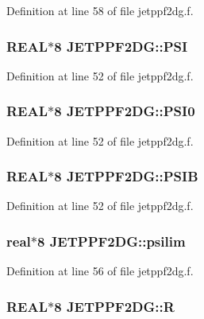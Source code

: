 Definition at line 58 of file jetppf2dg.f.\hypertarget{namespaceJETPPF2DG_b093dcbbe39feeaa433796831d6374de}{
\subsubsection[PSI]{\setlength{\rightskip}{0pt plus 5cm}REAL$\ast$8 {\bf JETPPF2DG::PSI}}}
\label{namespaceJETPPF2DG_b093dcbbe39feeaa433796831d6374de}




Definition at line 52 of file jetppf2dg.f.\hypertarget{namespaceJETPPF2DG_0aea03eeb6f87047b94e1a0b718253af}{
\subsubsection[PSI0]{\setlength{\rightskip}{0pt plus 5cm}REAL$\ast$8 {\bf JETPPF2DG::PSI0}}}
\label{namespaceJETPPF2DG_0aea03eeb6f87047b94e1a0b718253af}




Definition at line 52 of file jetppf2dg.f.\hypertarget{namespaceJETPPF2DG_e557339a1c12ba7e9ef7deadc7465739}{
\subsubsection[PSIB]{\setlength{\rightskip}{0pt plus 5cm}REAL$\ast$8 {\bf JETPPF2DG::PSIB}}}
\label{namespaceJETPPF2DG_e557339a1c12ba7e9ef7deadc7465739}




Definition at line 52 of file jetppf2dg.f.\hypertarget{namespaceJETPPF2DG_35264362cd8206b3671ba0049d7b3d5f}{
\subsubsection[psilim]{\setlength{\rightskip}{0pt plus 5cm}real$\ast$8 {\bf JETPPF2DG::psilim}}}
\label{namespaceJETPPF2DG_35264362cd8206b3671ba0049d7b3d5f}




Definition at line 56 of file jetppf2dg.f.\hypertarget{namespaceJETPPF2DG_e8aae9ece2ea51185b537f3815875dbe}{
\subsubsection[R]{\setlength{\rightskip}{0pt plus 5cm}REAL$\ast$8 {\bf JETPPF2DG::R}}}
\label{namespaceJETPPF2DG_e8aae9ece2ea51185b537f3815875dbe}




